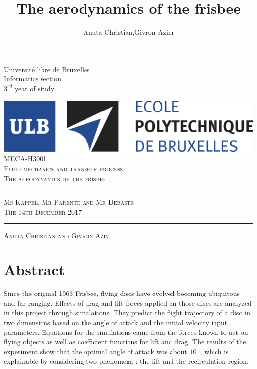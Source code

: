 \documentclass[10pt,a4paper]{report}
\author{Anuta Christian,Givron Azim}
\title{The aerodynamics of the frisbee}
\begin{document}
\begin{titlepage}
\noindent Université libre de Bruxelles
\\Informatics section
\\$3^{rd}$ year of study

\center 
\includegraphics[scale=0.5]{logo-polytech-ULB-FR.jpg}\\
\vspace{5cm}
\textsc{\large MECA-H3001} \\[0.5cm]
\textsc{\LARGE Fluid mechanics and transfer process} \\[1.5cm]
\textsc{\Large The aerodynamics of the frisbee} \\[1.5cm]
\rule{\textwidth}{1pt}

\vspace{0.5cm}
\textsc{\small Ms Kappel, Mr Parente and Mr Debaste} \\[0.5cm]
\textsc{\small The 14th December 2017} \\[0.5cm]

\rule{\textwidth}{1pt}

\vspace{2cm}

\textsc{\large Anuta Christian and Givron Azim}

\end{titlepage}

\tableofcontents
\newpage 
\listoffigures
\newpage
\section{Abstract}
Since the original 1963 Frisbee, flying discs have evolved becoming ubiquitous and far-ranging. Effects of drag and lift forces applied on those discs are analyzed in this project through simulations. They predict the flight trajectory of a disc in two dimensions based on the angle of attack and the initial velocity input parameters. Equations for the simulations came from the forces known to act on flying objects as well as coefficient functions for lift and drag. The results of the experiment show that the optimal angle of attack was about $10\,^{\circ}$, which is explainable by considering two phenomena : the lift and the recirculation region.
\end{document}
